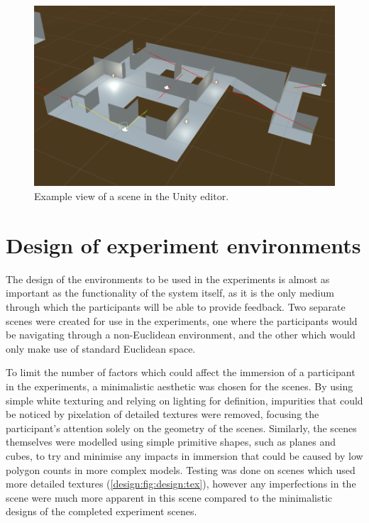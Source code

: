 		\begin{figure}[H]
			\includegraphics[width=1\textwidth]{Images/Lines_Everywhere2}
			\centering
			\caption{Example view of a scene in the Unity editor.}
			\label{design:fig:scene}
		\end{figure}

	\section[Environment Design]{Design of experiment environments}
	\label{design:design}

		The design of the environments to be used in the experiments is almost as important as the functionality of the system itself, as it is the only medium through which the participants will be able to provide feedback.
		Two separate scenes were created for use in the experiments, one where the participants would be navigating through a non-Euclidean environment, and the other which would only make use of standard Euclidean space.

		To limit the number of factors which could affect the immersion of a participant in the experiments, a minimalistic aesthetic was chosen for the scenes.
		By using simple white texturing and relying on lighting for definition, impurities that could be noticed by pixelation of detailed textures were removed, focusing the participant's attention solely on the geometry of the scenes.
		Similarly, the scenes themselves were modelled using simple primitive shapes, such as planes and cubes, to try and minimise any impacts in immersion that could be caused by low polygon counts in more complex models.
		Testing was done on scenes which used more detailed textures (\autoref{design:fig:design:tex}), however any imperfections in the scene were much more apparent in this scene compared to the minimalistic designs of the completed experiment scenes.

